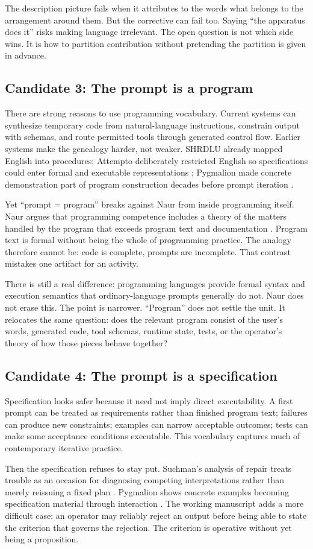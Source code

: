 \documentclass[11pt]{article}
\newcommand{\candidate}[1]{\subsection*{Candidate #1}}
\begin{document}
The description picture fails when it attributes to the words what belongs to the arrangement around them. But the corrective can fail too. Saying “the apparatus does it” risks making language irrelevant. The open question is not which side wins. It is how to partition contribution without pretending the partition is given in advance.

\candidate{3: The prompt is a program}
There are strong reasons to use programming vocabulary. Current systems can synthesize temporary code from natural-language instructions, constrain output with schemas, and route permitted tools through generated control flow. Earlier systems make the genealogy harder, not weaker. SHRDLU already mapped English into procedures; Attempto deliberately restricted English so specifications could enter formal and executable representations \parencite{winograd1973procedural,fuchs1996ace}; Pygmalion made concrete demonstration part of program construction decades before prompt iteration \parencite{smith1993pygmalion}.

Yet “prompt = program” breaks against Naur from inside programming itself. Naur argues that programming competence includes a theory of the matters handled by the program that exceeds program text and documentation \parencite{naur1985programming}. Program text is formal without being the whole of programming practice. The analogy therefore cannot be: code is complete, prompts are incomplete. That contrast mistakes one artifact for an activity.

There is still a real difference: programming languages provide formal syntax and execution semantics that ordinary-language prompts generally do not. Naur does not erase this. The point is narrower. “Program” does not settle the unit. It relocates the same question: does the relevant program consist of the user’s words, generated code, tool schemas, runtime state, tests, or the operator’s theory of how those pieces behave together?

\candidate{4: The prompt is a specification}
Specification looks safer because it need not imply direct executability. A first prompt can be treated as requirements rather than finished program text; failures can produce new constraints; examples can narrow acceptable outcomes; tests can make some acceptance conditions executable. This vocabulary captures much of contemporary iterative practice.

Then the specification refuses to stay put. Suchman’s analysis of repair treats trouble as an occasion for diagnosing competing interpretations rather than merely reissuing a fixed plan \parencite{suchman1985plans}. Pygmalion shows concrete examples becoming specification material through interaction \parencite{smith1993pygmalion}. The working manuscript adds a more difficult case: an operator may reliably reject an output before being able to state the criterion that governs the rejection. The criterion is operative without yet being a proposition.
\end{document}
